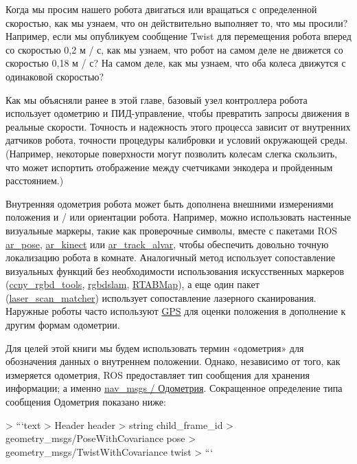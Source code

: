 

Когда мы просим нашего робота двигаться или вращаться с определенной скоростью, как мы узнаем, что он действительно выполняет то, что мы просили? Например, если мы опубликуем сообщение Twist для перемещения робота вперед со скоростью 0,2 м / с, как мы узнаем, что робот на самом деле не движется со скоростью 0,18 м / с? На самом деле, как мы узнаем, что оба колеса движутся с одинаковой скоростью?

Как мы объясняли ранее в этой главе, базовый узел контроллера робота использует одометрию и ПИД-управление, чтобы превратить запросы движения в реальные скорости. Точность и надежность этого процесса зависит от внутренних датчиков робота, точности процедуры калибровки и условий окружающей среды. (Например, некоторые поверхности могут позволить колесам слегка скользить, что может испортить отображение между счетчиками энкодера и пройденным расстоянием.)

Внутренняя одометрия робота может быть дополнена внешними измерениями положения и / или ориентации робота. Например, можно использовать настенные визуальные маркеры, такие как проверочные символы, вместе с пакетами ROS \href{http://wiki.ros.org/ar_pose}{ar\_pose}, \href{http://wiki.ros.org/ar_kinect}{ar\_kinect} или \href{http://wiki.ros.org/ar_track_alvar}{ar\_track\_alvar}, чтобы обеспечить довольно точную локализацию робота в комнате. Аналогичный метод использует сопоставление визуальных функций без необходимости использования искусственных маркеров (\href{http://wiki.ros.org/ccny_rgbd_tools}{ccny\_rgbd\_tools}, \href{http://wiki.ros.org/rgbdslam}{rgbdslam}, \href{http://introlab.github.io/rtabmap/}{RTABMap}), а еще один пакет (\href{http://wiki.ros.org/laser_scan_matcher}{laser\_scan\_matcher}) использует сопоставление лазерного сканирования. Наружные роботы часто используют \href{http://wiki.ros.org/robot_pose_ekf/Tutorials/AddingGpsSensor}{GPS} для оценки положения в дополнение к другим формам одометрии.

Для целей этой книги мы будем использовать термин «одометрия» для обозначения данных о внутреннем положении. Однако, независимо от того, как измеряется одометрия, ROS предоставляет тип сообщения для хранения информации; а именно \href{http://www.ros.org/doc/api/nav_msgs/html/msg/Odometry.html}{nav\_msgs / Одометрия}. Сокращенное определение типа сообщения Одометрия показано ниже:

> ```text
> Header header
> string child_frame_id
> geometry_msgs/PoseWithCovariance pose
> geometry_msgs/TwistWithCovariance twist
> ```

